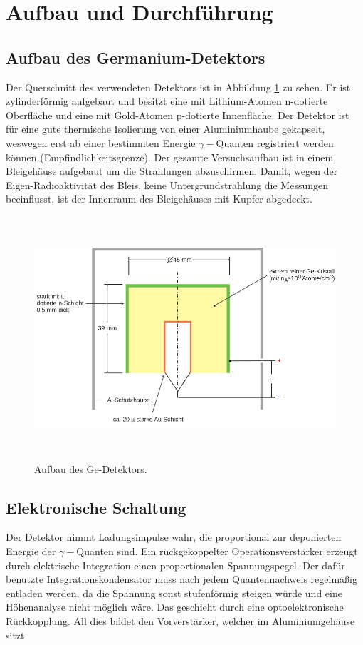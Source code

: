 \newpage
\section{Aufbau und Durchführung}
\label{sec:Durchfuehrung}
\subsection{Aufbau des Germanium-Detektors}
Der Querschnitt des verwendeten Detektors ist in Abbildung \ref{fig:Detektor} zu sehen.
Er ist zylinderförmig aufgebaut und besitzt eine mit Lithium-Atomen n-dotierte Oberfläche und eine mit Gold-Atomen p-dotierte Innenfläche.
Der Detektor ist für eine gute thermische Isolierung von einer Aluminiumhaube gekapselt, weswegen erst ab einer bestimmten Energie $\gamma-$Quanten registriert werden können (Empfindlichkeitsgrenze).
Der gesamte Versuchsaufbau ist in einem Bleigehäuse aufgebaut um die Strahlungen abzuschirmen.
Damit, wegen der Eigen-Radioaktivität des Bleis, keine Untergrundstrahlung die Messungen beeinflusst, ist der Innenraum des Bleigehäuses mit Kupfer abgedeckt.
 \begin{figure}
   \centering
   \includegraphics[height=9cm]{content/pictures/Detektor.png}
   \caption{Aufbau des Ge-Detektors.\cite{V18}}
   \label{fig:Detektor}
 \end{figure}
\subsection{Elektronische Schaltung}
Der Detektor nimmt Ladungsimpulse wahr, die proportional zur deponierten Energie der $\gamma-$Quanten sind.
Ein rückgekoppelter Operationsverstärker erzeugt durch elektrische Integration einen proportionalen Spannungspegel.
Der dafür benutzte Integrationskondensator muss nach jedem Quantennachweis regelmäßig entladen werden, da die Spannung sonst stufenförmig steigen würde und eine Höhenanalyse nicht möglich wäre.
Das geschieht durch eine optoelektronische Rückkopplung.
All dies bildet den Vorverstärker, welcher im Aluminiumgehäuse sitzt.

